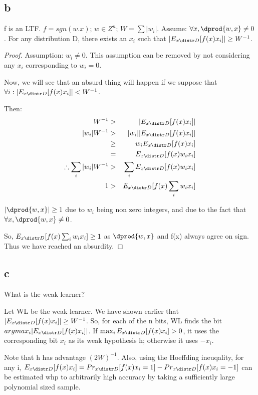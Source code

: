 \documentclass[10pt]{amsart}
\begin{document}
\subsection{b}
\begin{thm}
f is an LTF. $f=sgn(w.x)$; $w\in Z^{n}$; $W = \sum |w_{i}|$. Assume: $\forall x, \dprod{w,x} \neq 0$. For any distribution D, there exists an $x_{i}$ such that $|E_{x\distr D}[f(x)x_{i}]|\geq W^{-1}$.
\end{thm}
\begin{proof}
Assumption: $w_{i} \neq 0$. This assumption can be removed by not considering any $x_{i}$ corresponding to $w_{i} = 0$.

Now, we will see that an absurd thing will happen if we suppose that $\forall i : |E_{x\distr D}[f(x)x_{i}]| < W^{-1}$.

Then:
\begin{eqnarray*}
W^{-1} &>& |E_{x\distr D}[f(x)x_{i}]|\\
|w_{i}|W^{-1} &>& |w_{i}||E_{x\distr D}[f(x)x_{i}]|\\
&\geq& w_{i}E_{x\distr D}[f(x)x_{i}]\\
&=& E_{x\distr D}[f(x)w_{i}x_{i}]\\
\therefore \sum_{i}|w_{i}|W^{-1} &>& \sum_{i}E_{x\distr D}[f(x)w_{i}x_{i}]\\
1 &>& E_{x\distr D}[f(x)\sum_{i}w_{i}x_{i}]\\
\end{eqnarray*}

$|\dprod{w,x}|\geq 1$ due to $w_{i}$ being non zero integers, and due to the fact that \\
$\forall x, \dprod{w,x} \neq 0$.

So, $E_{x\distr D}[f(x)\sum_{i}w_{i}x_{i}] \geq 1$ as $\dprod{w,x}$ and f(x) always agree on sign. Thus we have reached an absurdity.
\end{proof}

\subsection{c}
\begin{question}
What is the weak learner?
\end{question}
\begin{answer}
Let WL be the weak learner. We have shown earlier that \\
$|E_{x\distr D}[f(x)x_{i}]|\geq W^{-1}$. So, for each of the n bits, WL finds the bit \\
$argmax_{i} |E_{x\distr D}[f(x)x_{i}]|$. If $\max_{i} E_{x\distr D}[f(x)x_{i}] > 0$, it uses the corresponding bit $x_{i}$ as its weak hypothesis h; otherwise it uses $-x_{i}$.

Note that h has advantage $(2W)^{-1}$. Also, using the Hoeffding ineuqality, for any i, $E_{x\distr D}[f(x)x_{i}] = Pr_{x \distr D}[f(x)x_{i} = 1] - Pr_{x \distr D}[f(x)x_{i} = -1]$ can be estimated whp to arbitrarily high accuracy by taking a sufficiently large polynomial sized sample.
\end{answer}
\end{document}
